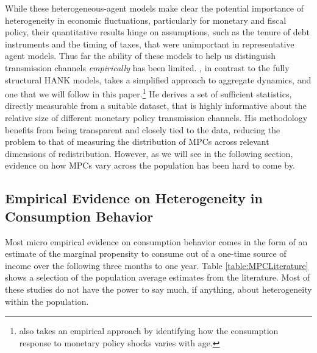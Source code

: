 \documentclass[titlepage]{\econtex}\newcommand{\texname}{ConsumptionHeterogeneity}
\begin{document}
	While these heterogeneous-agent models make clear the potential importance of heterogeneity in economic fluctuations, particularly for monetary and fiscal policy, their quantitative results hinge on assumptions, such as the tenure of debt instruments and the timing of taxes, that were unimportant in representative agent models. Thus far the ability of these models to help us distinguish transmission channels \textit{empirically} has been limited. \cite{auclert_monetary_2017}, in contrast to the fully structural HANK models, takes a simplified approach to aggregate dynamics, and one that we will follow in this paper.\footnote{\cite{wong_population_2016} also takes an empirical approach by identifying how the consumption response to monetary policy shocks varies with age.} He derives a set of sufficient statistics, directly measurable from a suitable dataset, that is highly informative about the  relative size of different monetary policy transmission channels. His methodology benefits from being transparent and closely tied to the data, reducing the problem to that of measuring the distribution of MPCs across relevant dimensions of redistribution. However, as we will see in the following section, evidence on how MPCs vary across the population has been hard to come by. 
	
	\subsection{Empirical Evidence on Heterogeneity in Consumption Behavior} \label{MPCEmpirics}
	Most micro empirical evidence on consumption behavior comes in the form of an estimate of the marginal propensity to consume out of a one-time source of income over the following three months to one year. Table \ref{table:MPCLiterature} shows a selection of the population average estimates from the literature. Most of these studies do not have the power to say much, if anything, about heterogeneity within the population.
	
\end{document}
